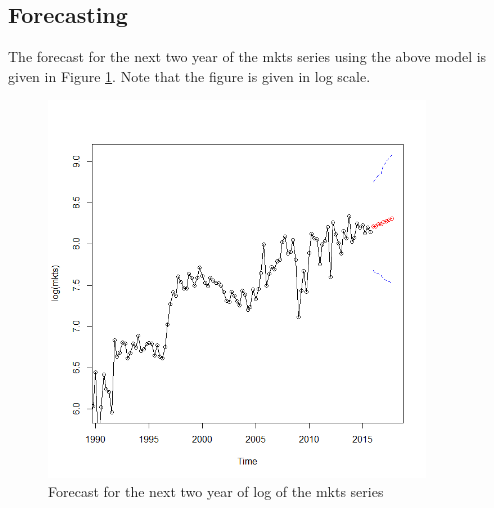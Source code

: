 \subsection{Forecasting}
The forecast for the next two year of the mkts series using the above model is given in Figure \ref{fig:forecast}. Note that the figure is given in log scale.
\begin{figure}
	\centering
	\includegraphics[width=10cm]{Figures/Problem1_forecast}
	\caption{Forecast for the next two year of log of the mkts series}
	\label{fig:forecast}
\end{figure}